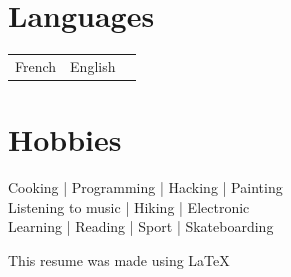 \documentclass[a4paper,10pt]{article}
\begin{document}
\begin{adjustbox}{valign=t}
\begin{minipage}{0.6\textwidth}
\begin{multicols}{2}
\section*{Languages}
\begin{tabular}{ll}
    French & 
    English & 
\end{tabular}

\vfill\null \columnbreak  %

\section*{Hobbies}

\begin{spacing}{0.9}
Cooking | Programming | Hacking | Painting\\
Listening to music | Hiking | Electronic\\
Learning | Reading | Sport | Skateboarding
\end{spacing}

\vfill\null  %

\end{multicols}
\vspace{-1\baselineskip}

\LastUpdate

\vfill
\begin{flushright}
    This resume was made using \LaTeX
\end{flushright}
\end{minipage}
\end{adjustbox}
\end{document}
